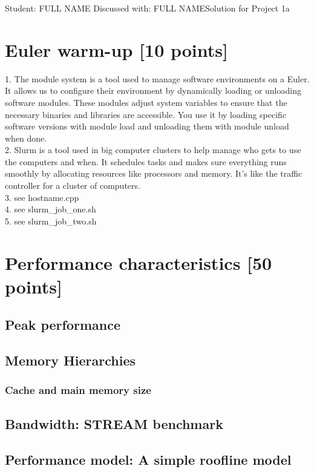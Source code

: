 \documentclass[unicode,11pt,a4paper,oneside,numbers=endperiod,openany]{scrartcl}
\begin{document}
\setassignment
{}

            {Student: FULL NAME}
            {Discussed with: FULL NAME}{Solution for Project 1a}{}
\newline

\assignmentpolicy

\section{Euler warm-up [10 points]}

1. The module system is a tool used to manage software environments on a Euler. 
It allows us to configure their environment by dynamically loading or unloading software modules. 
These modules adjust system variables to ensure that the necessary binaries and libraries are accessible.
You use it by loading specific software versions with module load and unloading them with module unload when done.
\\
2. Slurm is a tool used in big computer clusters to help manage who gets to use the computers and when. 
It schedules tasks and makes sure everything runs smoothly by allocating resources like processors and memory.
It's like the traffic controller for a cluster of computers.
\\
3.
see hostname.cpp
\\
4.
see slurm\_job\_one.sh
\\
5.
see slurm\_job\_two.sh

\section{Performance characteristics [50 points]}

\subsection{Peak performance}

\subsection{Memory Hierarchies}

\subsubsection{Cache and main memory size}

\subsection{Bandwidth: STREAM benchmark}

\subsection{Performance model: A simple roofline model}
\end{document}

